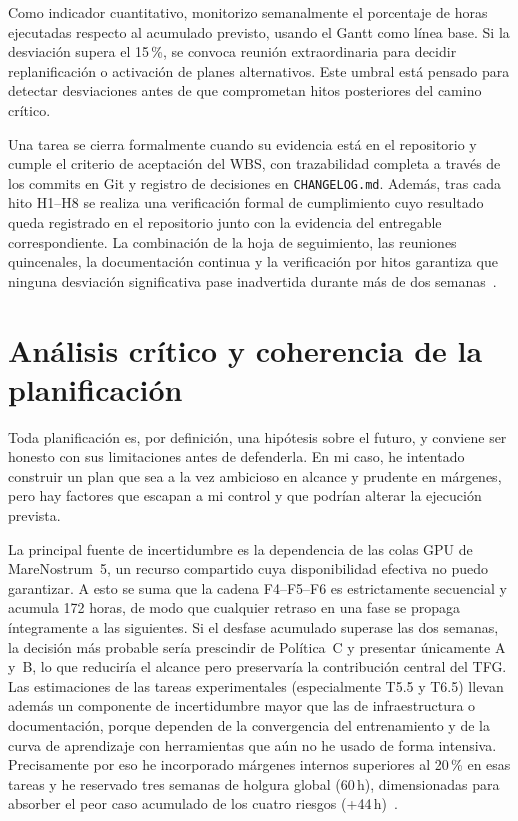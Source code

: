 \documentclass[11pt,a4paper]{article}
\begin{document}
Como indicador cuantitativo, monitorizo semanalmente el porcentaje de horas ejecutadas respecto al acumulado previsto, usando el Gantt como línea base. Si la desviación supera el 15\,\%, se convoca reunión extraordinaria para decidir replanificación o activación de planes alternativos. Este umbral está pensado para detectar desviaciones antes de que comprometan hitos posteriores del camino crítico.

Una tarea se cierra formalmente cuando su evidencia está en el repositorio y cumple el criterio de aceptación del WBS, con trazabilidad completa a través de los commits en Git y registro de decisiones en \texttt{CHANGELOG.md}. Además, tras cada hito H1--H8 se realiza una verificación formal de cumplimiento cuyo resultado queda registrado en el repositorio junto con la evidencia del entregable correspondiente. La combinación de la hoja de seguimiento, las reuniones quincenales, la documentación continua y la verificación por hitos garantiza que ninguna desviación significativa pase inadvertida durante más de dos semanas~\cite{gep23}.

\section{Análisis crítico y coherencia de la planificación}

Toda planificación es, por definición, una hipótesis sobre el futuro, y conviene ser honesto con sus limitaciones antes de defenderla. En mi caso, he intentado construir un plan que sea a la vez ambicioso en alcance y prudente en márgenes, pero hay factores que escapan a mi control y que podrían alterar la ejecución prevista.

La principal fuente de incertidumbre es la dependencia de las colas GPU de MareNostrum~5, un recurso compartido cuya disponibilidad efectiva no puedo garantizar. A esto se suma que la cadena F4--F5--F6 es estrictamente secuencial y acumula 172 horas, de modo que cualquier retraso en una fase se propaga íntegramente a las siguientes. Si el desfase acumulado superase las dos semanas, la decisión más probable sería prescindir de Política~C y presentar únicamente A y~B, lo que reduciría el alcance pero preservaría la contribución central del TFG. Las estimaciones de las tareas experimentales (especialmente T5.5 y T6.5) llevan además un componente de incertidumbre mayor que las de infraestructura o documentación, porque dependen de la convergencia del entrenamiento y de la curva de aprendizaje con herramientas que aún no he usado de forma intensiva. Precisamente por eso he incorporado márgenes internos superiores al 20\,\% en esas tareas y he reservado tres semanas de holgura global (60\,h), dimensionadas para absorber el peor caso acumulado de los cuatro riesgos (+44\,h)~\cite{pmbok}.
\end{document}
